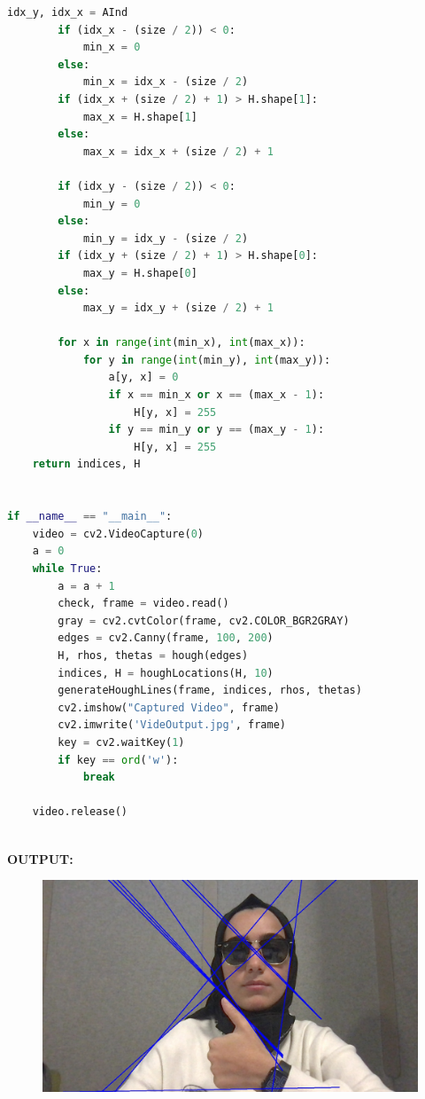 \documentclass[a4paper, 12pt]{report}
\begin{document}
{{\begin{lstlisting}[language=Python]
        idx_y, idx_x = AInd
        if (idx_x - (size / 2)) < 0:
            min_x = 0
        else:
            min_x = idx_x - (size / 2)
        if (idx_x + (size / 2) + 1) > H.shape[1]:
            max_x = H.shape[1]
        else:
            max_x = idx_x + (size / 2) + 1

        if (idx_y - (size / 2)) < 0:
            min_y = 0
        else:
            min_y = idx_y - (size / 2)
        if (idx_y + (size / 2) + 1) > H.shape[0]:
            max_y = H.shape[0]
        else:
            max_y = idx_y + (size / 2) + 1

        for x in range(int(min_x), int(max_x)):
            for y in range(int(min_y), int(max_y)):
                a[y, x] = 0
                if x == min_x or x == (max_x - 1):
                    H[y, x] = 255
                if y == min_y or y == (max_y - 1):
                    H[y, x] = 255
    return indices, H


if __name__ == "__main__":
    video = cv2.VideoCapture(0)
    a = 0
    while True:
        a = a + 1
        check, frame = video.read()
        gray = cv2.cvtColor(frame, cv2.COLOR_BGR2GRAY)
        edges = cv2.Canny(frame, 100, 200)
        H, rhos, thetas = hough(edges)
        indices, H = houghLocations(H, 10)
        generateHoughLines(frame, indices, rhos, thetas)
        cv2.imshow("Captured Video", frame)
        cv2.imwrite('VideOutput.jpg', frame)
        key = cv2.waitKey(1)
        if key == ord('w'):
            break

    video.release()



\end{lstlisting}
\textbf{OUTPUT:}

\begin{figure}[h]
\includegraphics[scale=.27]{VideOutput.jpg}
\centering
\end{figure}




}}
\end{document}
